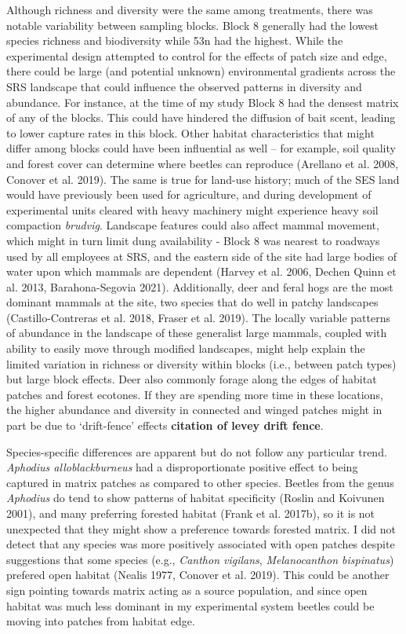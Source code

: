 \documentclass[
  man, donotrepeattitle]{apa6}
\begin{document}
Although richness and diversity were the same among treatments, there was notable variability between sampling blocks. Block 8 generally had the lowest species richness and biodiversity while 53n had the highest. While the experimental design attempted to control for the effects of patch size and edge, there could be large (and potential unknown) environmental gradients across the SRS landscape that could influence the observed patterns in diversity and abundance. For instance, at the time of my study Block 8 had the densest matrix of any of the blocks. This could have hindered the diffusion of bait scent, leading to lower capture rates in this block. Other habitat characteristics that might differ among blocks could have been influential as well -- for example, soil quality and forest cover can determine where beetles can reproduce (Arellano et al. 2008, Conover et al. 2019). The same is true for land-use history; much of the SES land would have previously been used for agriculture, and during development of experimental units cleared with heavy machinery might experience heavy soil compaction \emph{brudvig}. Landscape features could also affect mammal movement, which might in turn limit dung availability - Block 8 was nearest to roadways used by all employees at SRS, and the eastern side of the site had large bodies of water upon which mammals are dependent (Harvey et al. 2006, Dechen Quinn et al. 2013, Barahona-Segovia 2021). Additionally, deer and feral hogs are the most dominant mammals at the site, two species that do well in patchy landscapes (Castillo-Contreras et al. 2018, Fraser et al. 2019). The locally variable patterns of abundance in the landscape of these generalist large mammals, coupled with ability to easily move through modified landscapes, might help explain the limited variation in richness or diversity within blocks (i.e., between patch types) but large block effects. Deer also commonly forage along the edges of habitat patches and forest ecotones. If they are spending more time in these locations, the higher abundance and diversity in connected and winged patches might in part be due to `drift-fence' effects \textbf{citation of levey drift fence}.

Species-specific differences are apparent but do not follow any particular trend. \emph{Aphodius alloblackburneus} had a disproportionate positive effect to being captured in matrix patches as compared to other species. Beetles from the genus \emph{Aphodius} do tend to show patterns of habitat specificity (Roslin and Koivunen 2001), and many preferring forested habitat (Frank et al. 2017b), so it is not unexpected that they might show a preference towards forested matrix. I did not detect that any species was more positively associated with open patches despite suggestions that some species (e.g., \emph{Canthon vigilans}, \emph{Melanocanthon bispinatus}) prefered open habitat (Nealis 1977, Conover et al. 2019). This could be another sign pointing towards matrix acting as a source population, and since open habitat was much less dominant in my experimental system beetles could be moving into patches from habitat edge.
\end{document}
